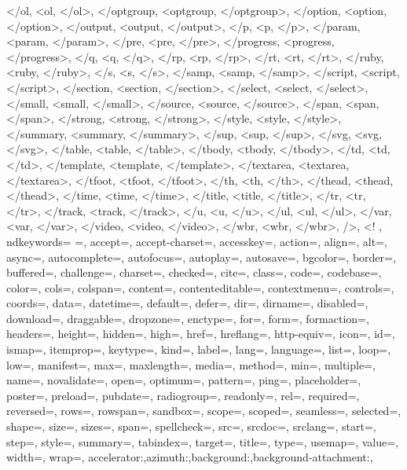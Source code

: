 {{        </ol, <ol, </ol>,
        </optgroup, <optgroup, </optgroup>,
        </option, <option, </option>,
        </output, <output, </output>,
        </p, <p, </p>,
        </param, <param, </param>,
        </pre, <pre, </pre>,
        </progress, <progress, </progress>,
        </q, <q, </q>,
        </rp, <rp, </rp>,
        </rt, <rt, </rt>,
        </ruby, <ruby, </ruby>,
        </s, <s, </s>,
        </samp, <samp, </samp>,
        </script, <script, </script>,
        </section, <section, </section>,
        </select, <select, </select>,
        </small, <small, </small>,
        </source, <source, </source>,
        </span, <span, </span>,
        </strong, <strong, </strong>,
        </style, <style, </style>,
        </summary, <summary, </summary>,
        </sup, <sup, </sup>,
        </svg, <svg, </svg>,
        </table, <table, </table>,
        </tbody, <tbody, </tbody>,
        </td, <td, </td>,
        </template, <template, </template>,
        </textarea, <textarea, </textarea>,
        </tfoot, <tfoot, </tfoot>,
        </th, <th, </th>,
        </thead, <thead, </thead>,
        </time, <time, </time>,
        </title, <title, </title>,
        </tr, <tr, </tr>,
        </track, <track, </track>,
        </u, <u, </u>,
        </ul, <ul, </ul>,
        </var, <var, </var>,
        </video, <video, </video>,
        </wbr, <wbr, </wbr>,
        />, <!
        },
        ndkeywords={
        =,
        accept=, accept-charset=, accesskey=, action=, align=, alt=, async=, autocomplete=, autofocus=, autoplay=, autosave=, bgcolor=, border=, buffered=, challenge=, charset=, checked=, cite=, class=, code=, codebase=, color=, cols=, colspan=, content=, contenteditable=, contextmenu=, controls=, coords=, data=, datetime=, default=, defer=, dir=, dirname=, disabled=, download=, draggable=, dropzone=, enctype=, for=, form=, formaction=, headers=, height=, hidden=, high=, href=, hreflang=, http-equiv=, icon=, id=, ismap=, itemprop=, keytype=, kind=, label=, lang=, language=, list=, loop=, low=, manifest=, max=, maxlength=, media=, method=, min=, multiple=, name=, novalidate=, open=, optimum=, pattern=, ping=, placeholder=, poster=, preload=, pubdate=, radiogroup=, readonly=, rel=, required=, reversed=, rows=, rowspan=, sandbox=, scope=, scoped=, seamless=, selected=, shape=, size=, sizes=, span=, spellcheck=, src=, srcdoc=, srclang=, start=, step=, style=, summary=, tabindex=, target=, title=, type=, usemap=, value=, width=, wrap=,
        accelerator:,azimuth:,background:,background-attachment:,
}}
